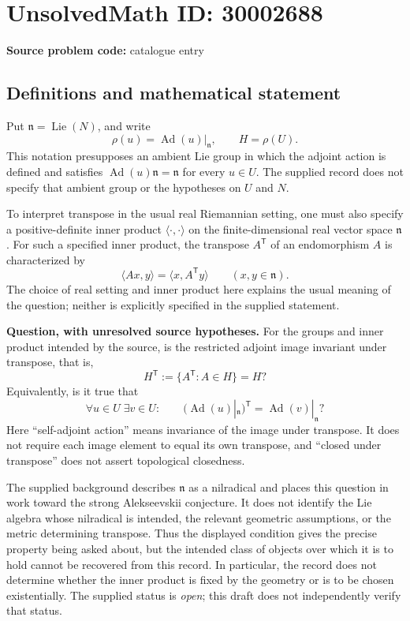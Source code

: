 \documentclass[11pt]{article}
\begin{document}
\section*{UnsolvedMath ID: 30002688}
\textbf{Source problem code:} catalogue entry
\subsection{Definitions and mathematical statement}
Put \(\mathfrak n=\operatorname{Lie}(N)\), and write
\[
\rho(u)=\operatorname{Ad}(u)|_{\mathfrak n},\qquad H=\rho(U).
\]
This notation presupposes an ambient Lie group in which the adjoint action is defined and satisfies \(\operatorname{Ad}(u)\mathfrak n=\mathfrak n\) for every \(u\in U\). The supplied record does not specify that ambient group or the hypotheses on \(U\) and \(N\).

To interpret transpose in the usual real Riemannian setting, one must also specify a positive-definite inner product \(\langle\cdot,\cdot\rangle\) on the finite-dimensional real vector space \(\mathfrak n\). For such a specified inner product, the transpose \(A^{\mathsf T}\) of an endomorphism \(A\) is characterized by
\[
\langle Ax,y\rangle=\langle x,A^{\mathsf T}y\rangle
\qquad(x,y\in\mathfrak n).
\]
The choice of real setting and inner product here explains the usual meaning of the question; neither is explicitly specified in the supplied statement.

\textbf{Question, with unresolved source hypotheses.} For the groups and inner product intended by the source, is the restricted adjoint image invariant under transpose, that is,
\[
H^{\mathsf T}:=\{A^{\mathsf T}:A\in H\}=H?
\]
Equivalently, is it true that
\[
\forall u\in U\;\exists v\in U:\qquad
\bigl(\operatorname{Ad}(u)|_{\mathfrak n}\bigr)^{\mathsf T}
=\operatorname{Ad}(v)|_{\mathfrak n}?
\]
Here ``self-adjoint action'' means invariance of the image under transpose. It does not require each image element to equal its own transpose, and ``closed under transpose'' does not assert topological closedness.

The supplied background describes \(\mathfrak n\) as a nilradical and places this question in work toward the strong Alekseevskii conjecture. It does not identify the Lie algebra whose nilradical is intended, the relevant geometric assumptions, or the metric determining transpose. Thus the displayed condition gives the precise property being asked about, but the intended class of objects over which it is to hold cannot be recovered from this record. In particular, the record does not determine whether the inner product is fixed by the geometry or is to be chosen existentially. The supplied status is \emph{open}; this draft does not independently verify that status.
\end{document}
